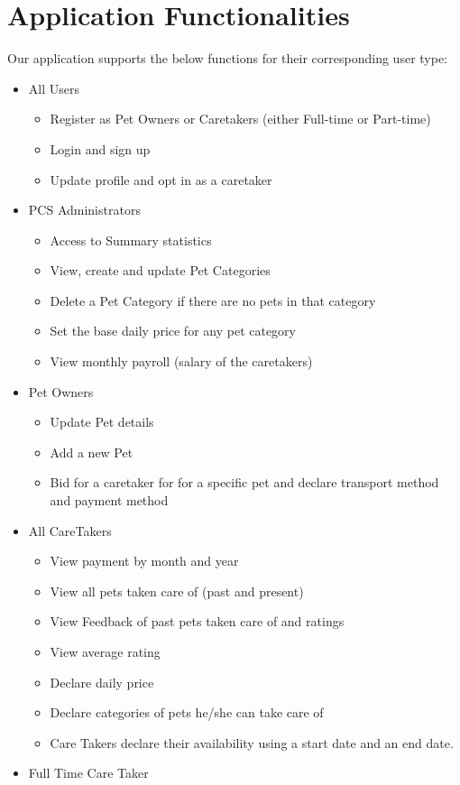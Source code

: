 \documentclass[
  paper=a4,
  ,captions=tableheading
]{scrartcl}
\providecommand{\tightlist}{%
  \setlength{\itemsep}{0pt}\setlength{\parskip}{0pt}}
\begin{document}
\hypertarget{application-functionalities}{%
\section{Application
Functionalities}\label{application-functionalities}}

Our application supports the below functions for their corresponding
user type:

\begin{itemize}
\tightlist
\item
  All Users

  \begin{itemize}
  \tightlist
  \item
    Register as Pet Owners or Caretakers (either Full-time or Part-time)
  \item
    Login and sign up
  \item
    Update profile and opt in as a caretaker
  \end{itemize}
\item
  PCS Administrators

  \begin{itemize}
  \tightlist
  \item
    Access to Summary statistics
  \item
    View, create and update Pet Categories
  \item
    Delete a Pet Category if there are no pets in that category
  \item
    Set the base daily price for any pet category
  \item
    View monthly payroll (salary of the caretakers)
  \end{itemize}
\item
  Pet Owners

  \begin{itemize}
  \tightlist
  \item
    Update Pet details
  \item
    Add a new Pet
  \item
    Bid for a caretaker for for a specific pet and declare transport
    method and payment method
  \end{itemize}
\item
  All CareTakers

  \begin{itemize}
  \tightlist
  \item
    View payment by month and year
  \item
    View all pets taken care of (past and present)
  \item
    View Feedback of past pets taken care of and ratings
  \item
    View average rating
  \item
    Declare daily price
  \item
    Declare categories of pets he/she can take care of
  \item
    Care Takers declare their availability using a start date and an end
    date.
  \end{itemize}
\item
  Full Time Care Taker


\end{itemize}
\end{document}
